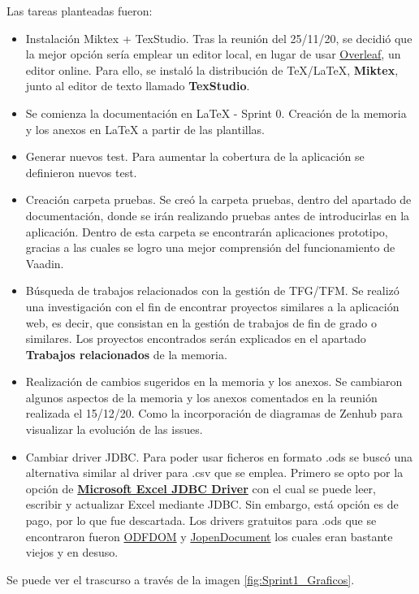 Las tareas planteadas fueron:
\begin{itemize}
	\tightlist
	\item Instalación Miktex + TexStudio. 
		Tras la reunión del 25/11/20, se decidió que la mejor opción sería emplear un editor local, en lugar de usar \href{https://es.overleaf.com/}{Overleaf}, un editor online. Para ello, se instaló la distribución de TeX/LaTeX, \textbf{Miktex}, junto al editor de texto llamado \textbf{TexStudio}.
	\item Se comienza la documentación en LaTeX  - Sprint 0. 
		Creación de la memoria y los anexos en LaTeX a partir de las plantillas.
	\item Generar nuevos test. 
		Para aumentar la cobertura de la aplicación se definieron nuevos test.
	\item Creación carpeta pruebas. 
		Se creó la carpeta pruebas, dentro del apartado de documentación, donde se irán realizando pruebas antes de introducirlas en la aplicación. Dentro de esta carpeta se encontrarán aplicaciones prototipo, gracias a las cuales se logro una mejor comprensión del funcionamiento de Vaadin.
	\item Búsqueda de trabajos relacionados con la gestión de TFG/TFM. 
		Se realizó una investigación con el fin de encontrar proyectos similares a la aplicación web, es decir, que consistan en la gestión de trabajos de fin de grado o similares. Los proyectos encontrados serán explicados en el apartado \textbf{Trabajos relacionados} de la memoria.
	\item Realización de cambios sugeridos en la memoria y los anexos. 
		Se cambiaron algunos aspectos de la memoria y los anexos comentados en la reunión realizada el 15/12/20. Como la incorporación de diagramas de Zenhub para visualizar la evolución de las issues.
	\item Cambiar driver JDBC. 
		Para poder usar ficheros en formato .ods se buscó una alternativa similar al driver para .csv que se emplea. Primero se opto por la opción de \textbf{\href{https://www.cdata.com/drivers/excel/jdbc/}{Microsoft Excel JDBC Driver}} con el cual se puede leer, escribir y actualizar Excel mediante JDBC. Sin embargo, está opción es de pago, por lo que fue descartada. Los drivers gratuitos para .ods que se encontraron fueron \href{https://odftoolkit.org/}{ODFDOM} y \href{http://www.jopendocument.org/}{JopenDocument} los cuales eran bastante viejos y en desuso. 
\end{itemize}

Se puede ver el trascurso a través de la imagen \ref{fig:Sprint1_Graficos}.

